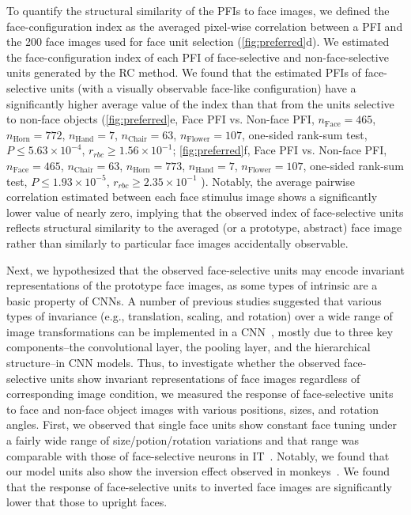 \documentclass[sn-mathphys-num]{sn-jnl}%
\theoremstyle{thmstyleone}%
\theoremstyle{thmstyletwo}%
\theoremstyle{thmstylethree}%
\begin{document}
To quantify the structural similarity of the PFIs to face images, we defined the face-configuration index as the averaged pixel-wise correlation between a PFI and the 200 face images used for face unit selection (\ref{fig:preferred}d).
We estimated the face-configuration index of each PFI of face-selective and non-face-selective units generated by the RC method.
We found that the estimated PFIs of face-selective units (with a visually observable face-like configuration) have a significantly higher average value of the index than that from the units selective to non-face objects (\ref{fig:preferred}e, 
Face PFI vs. Non-face PFI, 
$ n_\textrm{Face}    = 465 $,
$ n_\textrm{Horn}    = 772 $,
$ n_\textrm{Hand}    = 7   $,
$ n_\textrm{Chair}   = 63  $,
$ n_\textrm{Flower}  = 107 $,
one-sided rank-sum test,
$ P \leq 5.63 \times 10^{-4} $,
$ r_{rbc} \geq 1.56 \times 10^{-1} $;
\ref{fig:preferred}f, Face PFI vs. Non-face PFI,
$ n_\textrm{Face}   = 465 $,
$ n_\textrm{Chair}  = 63  $,
$ n_\textrm{Horn}	= 773 $,
$ n_\textrm{Hand}	= 7	  $,
$ n_\textrm{Flower}	= 107 $,
one-sided rank-sum test, 
$ P \leq 1.93 \times 10^{-5} $,
$ r_{rbc} \geq 2.35 \times 10^{-1} $
).
Notably, the average pairwise correlation estimated between each face stimulus image shows a significantly lower value of nearly zero, 
implying that the observed index of face-selective units reflects structural similarity to the averaged (or a prototype, abstract) face image rather than similarly to particular face images accidentally observable.


Next, we hypothesized that the observed face-selective units may encode invariant representations of the prototype face images, as some types of intrinsic are a basic property of CNNs.
A number of previous studies suggested that various types of invariance (e.g., translation, scaling, and rotation) over a wide range of image transformations can be implemented in a CNN~\cite{lecun2004learning,kavukcuoglu2010learning,lecun2012learning,chidester2018rotation,srivastava2018effect}, mostly due to three key components--the convolutional layer, the pooling layer, and the hierarchical structure--in CNN models.
Thus, to investigate whether the observed face-selective units show invariant representations of face images regardless of corresponding image condition, 
we measured the response of face-selective units to face and non-face object images with various positions, sizes, and rotation angles.
First, we observed that single face units show constant face tuning under a fairly wide range of size/potion/rotation variations and that range was comparable with those of face-selective neurons in IT~\cite{zoccolan2007trade}.
Notably, we found that our model units also show the inversion effect observed in monkeys~\cite{tsao2006cortical,buiatti2019cortical,perrett1985visual}.
We found that the response of face-selective units to inverted face images are significantly lower that those to upright faces.
\end{document}
